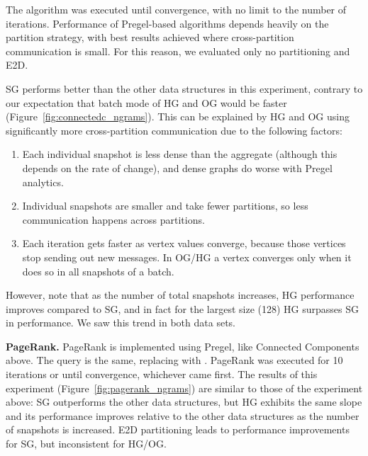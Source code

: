 The algorithm was executed until convergence, with no limit to the
number of iterations.  Performance of Pregel-based algorithms depends
heavily on the partition strategy, with best results achieved where
cross-partition communication is small.  For this reason, we evaluated
only no partitioning and E2D.

SG performs better than the other data structures in this experiment,
contrary to our expectation that batch mode of HG and OG would be
faster (Figure~\ref{fig:connectedc_ngrams}).  This can be explained by
HG and OG using significantly more cross-partition communication due
to the following factors:

\begin{enumerate}[leftmargin=*]
\item Each individual snapshot is less dense than the aggregate
  (although this depends on the rate of change), and dense graphs do
  worse with Pregel analytics.
\item Individual snapshots are smaller and take fewer partitions, so
  less communication happens across partitions.
\item Each iteration gets faster as vertex values converge, because
  those vertices stop sending out new messages.  In OG/HG a vertex
  converges only when it does so in all snapshots of a batch.
\end{enumerate}

However, note that as the number of total snapshots increases, HG
performance improves compared to SG, and in fact for the largest size
(128) HG surpasses SG in performance.  We saw this trend in both data
sets.


{\bf PageRank.} PageRank is implemented using Pregel, like Connected
Components above.  The query is the same, replacing 
with .  PageRank was executed for 10 iterations or
until convergence, whichever came first.  The results of this
experiment (Figure~\ref{fig:pagerank_ngrams}) are similar to those of
the experiment above: SG outperforms the other data structures, but HG
exhibits the same slope and its performance improves relative to the
other data structures as the number of snapshots is increased.  E2D
partitioning leads to performance improvements for SG, but
inconsistent for HG/OG.

